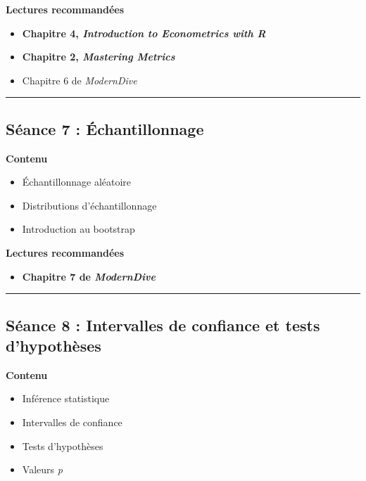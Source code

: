 \documentclass[
  11pt,
]{article}
\providecommand{\tightlist}{%
  \setlength{\itemsep}{0pt}\setlength{\parskip}{0pt}}
\begin{document}
\textbf{Lectures recommandées}

\begin{itemize}
\tightlist
\item
  \textbf{Chapitre 4, \emph{Introduction to Econometrics with R}}
\item
  \textbf{Chapitre 2, \emph{Mastering Metrics}}
\item
  Chapitre 6 de \emph{ModernDive}
\end{itemize}

\begin{center}\rule{0.5\linewidth}{0.5pt}\end{center}

\subsection{Séance 7 :
Échantillonnage}\label{suxe9ance-7-uxe9chantillonnage}

\textbf{Contenu}

\begin{itemize}
\tightlist
\item
  Échantillonnage aléatoire
\item
  Distributions d'échantillonnage
\item
  Introduction au bootstrap
\end{itemize}

\textbf{Lectures recommandées}

\begin{itemize}
\tightlist
\item
  \textbf{Chapitre 7 de \emph{ModernDive}}
\end{itemize}

\begin{center}\rule{0.5\linewidth}{0.5pt}\end{center}

\subsection{Séance 8 : Intervalles de confiance et tests
d'hypothèses}\label{suxe9ance-8-intervalles-de-confiance-et-tests-dhypothuxe8ses}

\textbf{Contenu}

\begin{itemize}
\tightlist
\item
  Inférence statistique
\item
  Intervalles de confiance
\item
  Tests d'hypothèses
\item
  Valeurs \emph{p}
\end{itemize}
\end{document}
